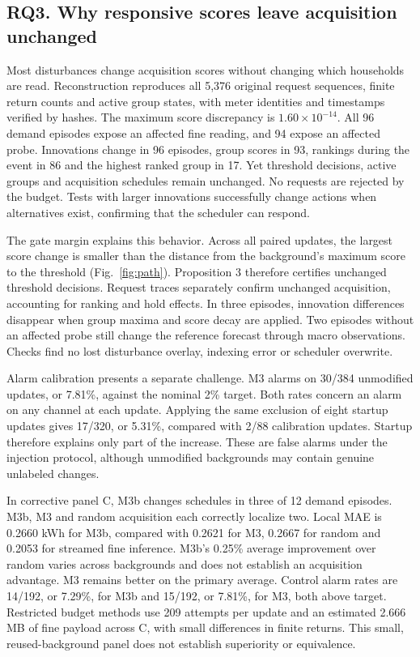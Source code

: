 \documentclass[conference]{IEEEtran}
\begin{document}
\subsection{RQ3. Why responsive scores leave acquisition unchanged}
Most disturbances change acquisition scores without changing which households are read. Reconstruction reproduces all 5,376 original request sequences, finite return counts and active group states, with meter identities and timestamps verified by hashes. The maximum score discrepancy is $1.60\times10^{-14}$. All 96 demand episodes expose an affected fine reading, and 94 expose an affected probe. Innovations change in 96 episodes, group scores in 93, rankings during the event in 86 and the highest ranked group in 17. Yet threshold decisions, active groups and acquisition schedules remain unchanged. No requests are rejected by the budget. Tests with larger innovations successfully change actions when alternatives exist, confirming that the scheduler can respond.

The gate margin explains this behavior. Across all \MarginChecks{} paired updates, the largest score change is smaller than the distance from the background's maximum score to the threshold (Fig.~\ref{fig:path}). Proposition 3 therefore certifies unchanged threshold decisions. Request traces separately confirm unchanged acquisition, accounting for ranking and hold effects. In three episodes, innovation differences disappear when group maxima and score decay are applied. Two episodes without an affected probe still change the reference forecast through macro observations. Checks find no lost disturbance overlay, indexing error or scheduler overwrite.

Alarm calibration presents a separate challenge. M3 alarms on 30/384 unmodified updates, or 7.81\%, against the nominal 2\% target. Both rates concern an alarm on any channel at each update. Applying the same exclusion of eight startup updates gives 17/320, or 5.31\%, compared with 2/88 calibration updates. Startup therefore explains only part of the increase. These are false alarms under the injection protocol, although unmodified backgrounds may contain genuine unlabeled changes.

In corrective panel C, M3b changes schedules in three of 12 demand episodes. M3b, M3 and random acquisition each correctly localize two. Local MAE is 0.2660 kWh for M3b, compared with 0.2621 for M3, 0.2667 for random and 0.2053 for streamed fine inference. M3b's 0.25\% average improvement over random varies across backgrounds and does not establish an acquisition advantage. M3 remains better on the primary average. Control alarm rates are 14/192, or 7.29\%, for M3b and 15/192, or 7.81\%, for M3, both above target. Restricted budget methods use 209 attempts per update and an estimated 2.666 MB of fine payload across C, with small differences in finite returns. This small, reused-background panel does not establish superiority or equivalence.
\end{document}
